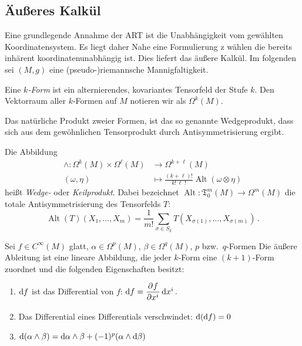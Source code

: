 \subsection{Äußeres Kalkül}
Eine grundlegende Annahme der ART ist die Unabhängigkeit vom gewählten
Koordinatensystem. Es liegt daher Nahe eine Formulierung z wählen die bereits
inhärent koordinatenunabhängig ist. Dies liefert das äußere Kalkül. Im folgenden
sei $(M,g)$ eine (pseudo-)riemannsche Mannigfaltigkeit.
\begin{definition}[Differentialform]
Eine \emph{$k$-Form} ist ein alternierendes, kovariantes Tensorfeld der Stufe
$k$. Den Vektorraum aller $k$-Formen auf $M$ notieren wir als $\Omega^k(M)$.
\end{definition}
Das natürliche Produkt zweier Formen, ist das so genannte Wedgeprodukt, dass
sich aus dem gewöhnlichen Tensorprodukt durch Antisymmetrisierung ergibt.
\begin{definition}[Wedgeprodukt]
Die Abbildung
\begin{equation}
\begin{split}
\wedge:\Omega^k(M)\times \Omega^\ell(M)&\to \Omega^{k+\ell}(M)\\
(\omega,\eta)&\mapsto\frac{(k+\ell)!}{k!\,\ell\;\!!}\operatorname{Alt}(\omega\otimes\eta)
\end{split}
\end{equation}
heißt \emph{Wedge-} oder \emph{Keilprodukt}.
Dabei bezeichnet $\operatorname{Alt}:\mathfrak{T}^{m}_0(M)\to \Omega^m(M)$ die
totale Antisymmetrisierung des Tensorfelds $T$:
\begin{equation}
\operatorname{Alt}(T)\left(X_1,\dots,X_m\right)=\frac{1}{m!}\sum_{\sigma\in
S_k}T\left(X_{\sigma(1)},\dots,X_{\sigma(m)}\right)\,.
\end{equation}
\end{definition}
\begin{definition}
Sei $f\in C^\infty(M)$ glatt, $\alpha\in \Omega^p(M)$, $\beta\in\Omega^q(M)$,
$p$ bzw.\ $q$-Formen Die äußere Ableitung ist eine lineare Abbildung, die jeder
$k$-Form eine $(k+1)$-Form zuordnet und die
folgenden Eigenschaften besitzt:
\begin{enumerate}
  \item $\dif f$ ist das Differential von $f$: $\dif
  f=\dpd{f}{\tensor{x}{^i}}\dif\tensor{x}{^i}\,.$
  \item Das Differential eines Differentials verschwindet: $\dif\,(\dif f)=0$
  \item $\dif\,(\alpha\wedge \beta)=\dif
  \alpha\wedge\beta+(-1)^p(\alpha\wedge\dif \beta)$
\end{enumerate}

\end{definition}
